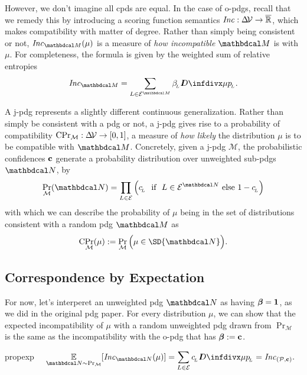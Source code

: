 \documentclass{article}
\begin{document}
However, we don't imagine all cpds are equal. 
In the case of o-pdgs, recall that we remedy this by introducing a scoring function semantics 
    $\mathit{Inc} : \Delta\!\mathcal V \to \overline{\mathbb R}$, 
    which makes compatibility with matter of degree. 
Rather than simply being consistent or not, 
    $\Inc_{\dg M}(\mu)$
    is a measure of \emph{how incompatible} $\dg M$ is with $\mu$.
 For completeness, the formula is given by the weighted sum of relative entropies
 \[
    \Inc_{\dg M} = \sum_{L \in \Ed^{\dg M}} \beta\ssub L \kldiv{\mu}{p \ssub L}.
 \]

 A j-pdg represents a slightly different continuous generalization. 
 Rather than simply be consistent with a pdg or not, a j-pdg gives rise to a probability of compatibility $\mathrm{C}\!\Pr_{\mathcal M}: \Delta\!\mathcal V \to [0,1]$, a measure of \emph{how likely} the distribution $\mu$ is to be compatible with $\dg M$.
Concretely, given a j-pdg $\mathcal M$, the probabilistic confidences $\mathbf{c}$ generate a probability distribution over unweighted sub-pdgs $\dg N$, by
\[ 
    \Pr_{\mathcal M}( \dg N )  = \prod_{L \in \Ed}\Big( c\ssub L ~\text{ if }~ L \in \Ed^{\dg N} \text{ else }1 - c\ssub L \Big)
\]
with which we can describe the probability of $\mu$ being in the set of distributions consistent with a random pdg $\dg M$ as 
\[
    \mathrm{C}\!\Pr_{\mathcal M}(\mu) := \Pr_{\mathcal M}\Big( \mu \in \SD{\dg N}\Big).
\]

\subsection{Correspondence by Expectation}
For now, let's interperet an unweighted pdg $\dg N$ as having $\boldsymbol\beta = \mathbf{1}$, as we did in the original pdg paper.  For every distribution $\mu$, we can show that the expected incompatibility of $\mu$ with a random unweighted pdg drawn from $\Pr_{\mathcal M}$ is the same as the incompatibility with the o-pdg that has $\boldsymbol\beta := \mathbf{c}$.


\vspace{-2ex}
\begin{linked}{prop}{exp}
    \vspace{2ex}
$\displaystyle\quad
    \Ex_{\dg N \sim \Pr_{\mathcal M}} [ \Inc_{\dg N}(\mu) ] 
    = \sum_{L \in \Ed} c\ssub L  \kldiv\mu{p\ssub L}
        = \Inc_{
            (\mathcal P, \mat c)}.
$
\end{linked}
\end{document}
